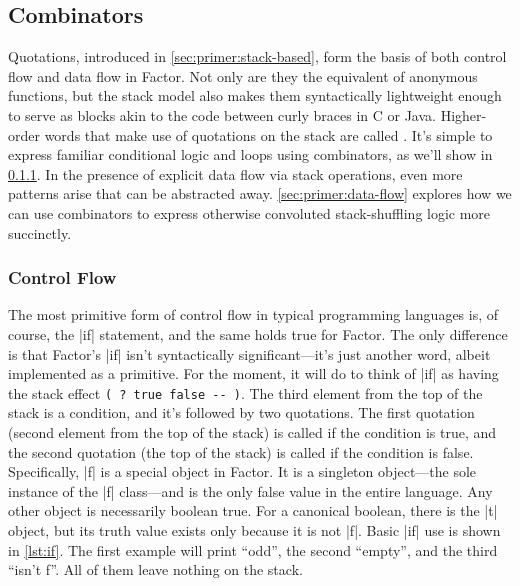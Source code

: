 \subsection{Combinators}\label{sec:primer:combinators}

Quotations, introduced in \cref{sec:primer:stack-based}, form the basis of both
control flow and data flow in Factor.  Not only are they the equivalent of
anonymous functions, but the stack model also makes them syntactically
lightweight enough to serve as blocks akin to the code between curly braces in
C or Java.  Higher-order words that make use of quotations on the stack are
called .  It's simple to express familiar conditional logic
and loops using combinators, as we'll show in \cref{sec:primer:control-flow}.
In the presence of explicit data flow via stack operations, even more patterns
arise that can be abstracted away.  \cref{sec:primer:data-flow} explores how we
can use combinators to express otherwise convoluted stack-shuffling logic more
succinctly.

\subsubsection{Control Flow}\label{sec:primer:control-flow}


The most primitive form of control flow in typical programming languages is, of
course, the |if| statement, and the same holds true for Factor.  The
only difference is that Factor's \factor|if| isn't syntactically
significant---it's just another word, albeit implemented as a primitive.  For
the moment, it will do to think of \factor|if| as having the stack effect
%
\Verb|( ? true false -- )|.
%
The third element from the top of the stack is a condition, and it's followed
by two quotations.  The first quotation (second element from the top of the
stack) is called if the condition is true, and the second quotation (the top of
the stack) is called if the condition is false.  Specifically, \factor|f| is a
special object in Factor.  It is a singleton object---the sole instance of the
\factor|f| class---and is the only false value in the entire language.  Any
other object is necessarily boolean true.  For a canonical boolean, there is
the \factor|t| object, but its truth value exists only because it is not
\factor|f|.  Basic \factor|if| use is shown in \cref{lst:if}.  The
first example will print ``odd'', the second ``empty'', and the third ``isn't
f''.  All of them leave nothing on the stack.

